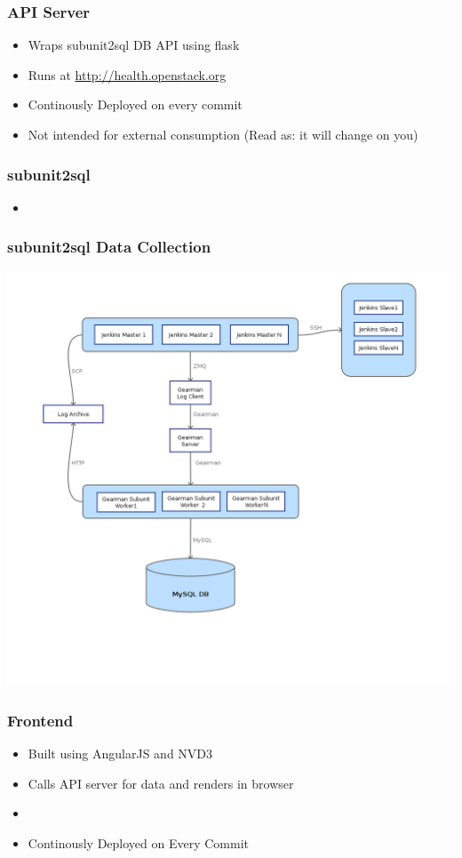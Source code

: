 \documentclass[aspectratio=169,11pt,hyperref={colorlinks=true}]{beamer}
\begin{document}
\begin{frame}
    \frametitle{API Server}
    \begin{itemize}
        \item Wraps subunit2sql DB API using flask
        \item Runs at \href{http://health.openstack.org}{http://health.openstack.org}
        \item Continously Deployed on every commit
		\item Not intended for external consumption (Read as: it will change on you)
    \end{itemize}
\end{frame}

\begin{frame}
    \frametitle{subunit2sql}
    \begin{itemize}
        \item 
    \end{itemize}
\end{frame}

\begin{frame}
    \frametitle{subunit2sql Data Collection}
    \begin{center}
        \includegraphics[width=.7\textwidth]{subunit2sql-collection.png}
    \end{center}
\end{frame}

\begin{frame}
    \frametitle{Frontend}
    \begin{itemize}
        \item Built using AngularJS and NVD3
        \item Calls API server for data and renders in browser
        \item
        \item Continously Deployed on Every Commit
    \end{itemize}
\end{frame}
\end{document}
